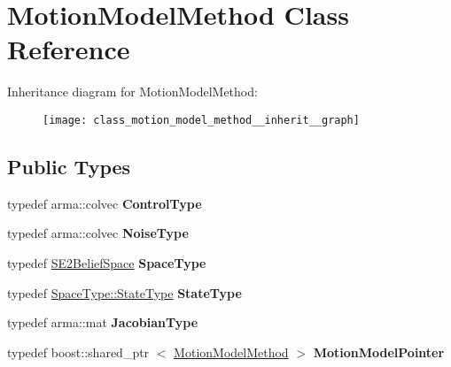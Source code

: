 \hypertarget{class_motion_model_method}{\section{\-Motion\-Model\-Method \-Class \-Reference}
\label{class_motion_model_method}
}


\-Inheritance diagram for \-Motion\-Model\-Method\-:
\nopagebreak
\begin{figure}[H]
\begin{center}
\leavevmode
\texttt{[image: class\_motion\_model\_method\_\_inherit\_\_graph]}
\end{center}
\end{figure}
\subsection*{\-Public \-Types}
\begin{DoxyCompactItemize}
\item 
\hypertarget{class_motion_model_method_a3d2d250cadace8b47d5eca028a2220e4}{typedef arma\-::colvec {\bfseries \-Control\-Type}}\label{class_motion_model_method_a3d2d250cadace8b47d5eca028a2220e4}

\item 
\hypertarget{class_motion_model_method_aecf04875853e2ecbebc66eb720adc63b}{typedef arma\-::colvec {\bfseries \-Noise\-Type}}\label{class_motion_model_method_aecf04875853e2ecbebc66eb720adc63b}

\item 
\hypertarget{class_motion_model_method_ada60008f50c4ec1f48956bf99fa846ed}{typedef \hyperlink{class_s_e2_belief_space}{\-S\-E2\-Belief\-Space} {\bfseries \-Space\-Type}}\label{class_motion_model_method_ada60008f50c4ec1f48956bf99fa846ed}

\item 
\hypertarget{class_motion_model_method_a15b3c3801cb64f85bfff7d088d276d91}{typedef \hyperlink{class_s_e2_belief_space_1_1_state_type}{\-Space\-Type\-::\-State\-Type} {\bfseries \-State\-Type}}\label{class_motion_model_method_a15b3c3801cb64f85bfff7d088d276d91}

\item 
\hypertarget{class_motion_model_method_a2c6d9dc15fc37a1d5079f72c4114ebed}{typedef arma\-::mat {\bfseries \-Jacobian\-Type}}\label{class_motion_model_method_a2c6d9dc15fc37a1d5079f72c4114ebed}

\item 
\hypertarget{class_motion_model_method_a94a8bd757d2cfb258a47cdd69079e506}{typedef boost\-::shared\-\_\-ptr\*
$<$ \hyperlink{class_motion_model_method}{\-Motion\-Model\-Method} $>$ {\bfseries \-Motion\-Model\-Pointer}}\label{class_motion_model_method_a94a8bd757d2cfb258a47cdd69079e506}

\end{DoxyCompactItemize}
